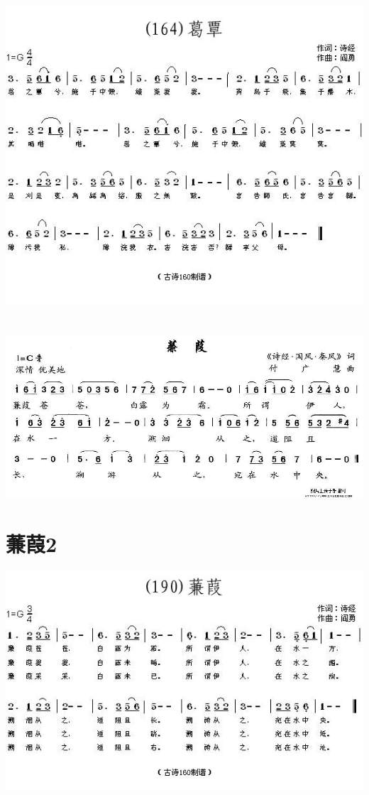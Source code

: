 \documentclass[cn,pad,twocol]{elegantbook}
\begin{document}
\section{}      \includegraphics[width=\textwidth]{rpi400/20210123-葛覃.jpg}
\section{}      \includegraphics[width=\textwidth]{rpi400/20210123-蒹葭.jpg}
\section{蒹葭2}     \includegraphics[width=\textwidth]{rpi400/20210123-蒹葭2.jpg}
\end{document}

